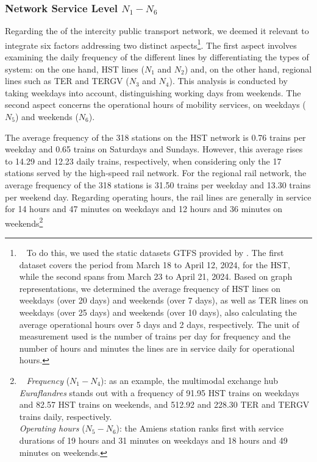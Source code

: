 \begin{refsegment}
\subsubsection*{Network Service Level \(N_{1} - N_{6}\)
    \label{chap6:indicateurs-node-niveau-service}
    }

Regarding the  of the intercity public transport network, we deemed it relevant to integrate six factors addressing two distinct aspects\footnote{~
    To do this, we used the static datasets \acrfull{GTFS} provided by \textcolor{blue}{\textcite{sncf_reseau_2024}}. The first dataset covers the period from March 18 to April 12, 2024, for the \acrshort{HST}, while the second spans from March 23 to April 21, 2024. Based on graph representations, we determined the average frequency of \acrshort{HST} lines on weekdays (over 20 days) and weekends (over 7 days), as well as \acrshort{TER} lines on weekdays (over 25 days) and weekends (over 10 days), also calculating the average operational hours over 5 days and 2 days, respectively. The unit of measurement used is the number of trains per day for frequency and the number of hours and minutes the lines are in service daily for operational hours.
}. The first aspect involves examining the daily frequency of the different lines by differentiating the types of system: on the one hand, \acrshort{HST} lines (\(N_{1}\) and \(N_{2}\)) and, on the other hand, regional lines such as \acrshort{TER} and \acrfull{TERGV} (\(N_{3}\) and \(N_{4}\)). This analysis is conducted by taking weekdays into account, distinguishing working days from weekends. The second aspect concerns the operational hours of mobility services, on weekdays (\(N_{5}\)) and weekends (\(N_{6}\)).%

The average frequency of the 318 stations on the \acrshort{HST} network is 0.76 trains per weekday and 0.65 trains on Saturdays and Sundays. However, this average rises to 14.29 and 12.23 daily trains, respectively, when considering only the 17 stations served by the high-speed rail network. For the regional rail network, the average frequency of the 318 stations is 31.50 trains per weekday and 13.30 trains per weekend day. Regarding operating hours, the rail lines are generally in service for 14 hours and 47 minutes on weekdays and 12 hours and 36 minutes on weekends\footnote{~
    \textsl{Frequency} (\(N_{1} - N_{4}\)): as an example, the multimodal exchange hub \textsl{Euraflandres} stands out with a frequency of 91.95 \acrshort{HST} trains on weekdays and 82.57 \acrshort{HST} trains on weekends, and 512.92 and 228.30 \acrshort{TER} and \acrshort{TERGV} trains daily, respectively.
    \\
    \textsl{Operating hours} (\(N_{5} - N_{6}\)): the Amiens station ranks first with service durations of 19 hours and 31 minutes on weekdays and 18 hours and 49 minutes on weekends.
}%


\end{refsegment}
